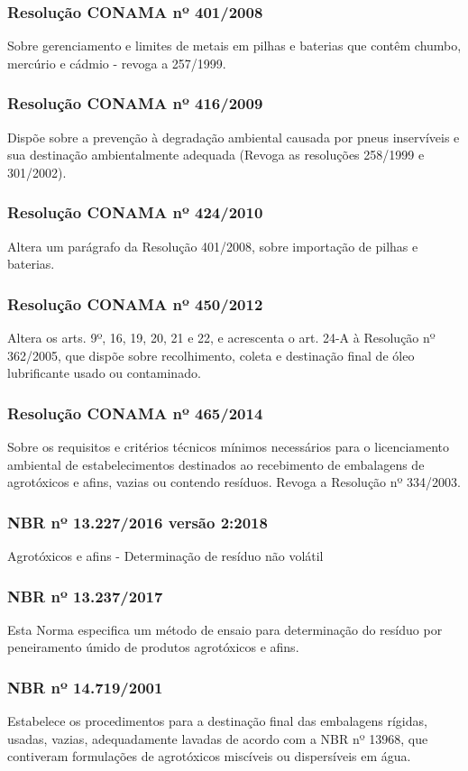 \begin{subapend}
\begin{subsubapend}
		\subsubsection{Resolução CONAMA nº 401/2008}
		Sobre gerenciamento e limites de metais em pilhas e baterias que contêm chumbo, mercúrio e cádmio - revoga a 257/1999.
		\subsubsection{Resolução CONAMA nº 416/2009}
		Dispõe sobre a prevenção à degradação ambiental causada por pneus inservíveis e sua destinação ambientalmente adequada (Revoga as resoluções 258/1999 e 301/2002).
		\subsubsection{Resolução CONAMA nº 424/2010}
		Altera um parágrafo da Resolução 401/2008, sobre importação de pilhas e baterias.
		\subsubsection{Resolução CONAMA nº 450/2012}
		Altera os arts. 9º, 16, 19, 20, 21 e 22, e acrescenta o art. 24-A à Resolução nº 362/2005, que dispõe sobre recolhimento, coleta e destinação final de óleo lubrificante usado ou contaminado.
		\subsubsection{Resolução CONAMA nº 465/2014}
		Sobre os requisitos e critérios técnicos mínimos necessários para o licenciamento ambiental de estabelecimentos destinados ao recebimento de embalagens de agrotóxicos e afins, vazias ou contendo resíduos. Revoga a Resolução nº 334/2003.
		\subsubsection{NBR nº 13.227/2016 versão 2:2018}
		Agrotóxicos e afins - Determinação de resíduo não volátil
		\subsubsection{NBR nº 13.237/2017}
		Esta Norma especifica um método de ensaio para determinação do resíduo por peneiramento úmido de produtos agrotóxicos e afins. 
		\subsubsection{NBR nº 14.719/2001}
		Estabelece os procedimentos para a destinação final das embalagens rígidas, usadas, vazias, adequadamente lavadas de acordo com a NBR nº 13968, que contiveram formulações de agrotóxicos miscíveis ou dispersíveis em água.

\end{subsubapend}
\end{subapend}
